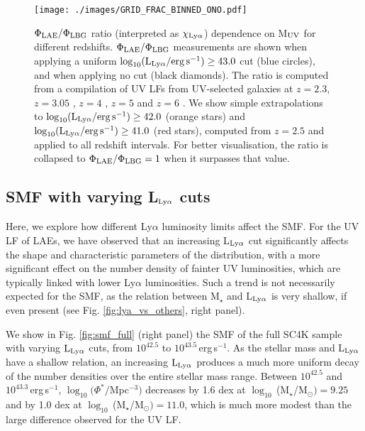 \documentclass[a4paper,fleqn,usenatbib]{mnras}
\begin{document}
%
%
\begin{figure*}
  \centering
  \texttt{[image: ./images/GRID\_FRAC\_BINNED\_ONO.pdf]}
  \caption{$\Phi_{\rm LAE}/\Phi_{\rm LBG}$ ratio (interpreted as $\chi_{\rm Ly\alpha}$) dependence on M$_{\rm UV}$ for different redshifts. $\Phi_{\rm LAE}/\Phi_{\rm LBG}$ measurements are shown when applying a uniform $\log_{10} (\rm L_{Ly\alpha}/erg\,s^{-1}) \geq 43.0$ cut (blue circles), and when applying no cut (black diamonds). The ratio is computed from a compilation of UV LFs from UV-selected galaxies at $z=2.3$, $z=3.05$ \citep{Reddy2009}, $z=4$ , $z=5$ and $z=6$ \citep{Ono2018}. We show simple extrapolations to $\log_{10} (\rm L_{Ly\alpha}/erg\,s^{-1}) \geq 42.0$ (orange stars) and $\log_{10} (\rm L_{Ly\alpha}/erg\,s^{-1}) \geq 41.0$ (red stars), computed from $z=2.5$ and applied to all redshift intervals. For better visualisation, the ratio is collapsed to $\Phi_{\rm LAE}/\Phi_{\rm LBG}=1$ when it surpasses that value.}
  \label{fig:lya_fraction_muv}
\end{figure*}


\subsection{SMF with varying {\rm L$_{\rm Ly\alpha}$} cuts} \label{sec:smf_vary}

Here, we explore how different Ly$\alpha$ luminosity limits affect the SMF. For the UV LF of LAEs, we have observed that an increasing L$_{\rm Ly\alpha}$ cut significantly affects the shape and characteristic parameters of the distribution, with a more significant effect on the number density of fainter UV luminosities, which are typically linked with lower Ly$\alpha$ luminosities. Such a trend is not necessarily expected for the SMF, as the relation between M$_\star$ and L$_{\rm Ly\alpha}$ is very shallow, if even present (see Fig. \ref{fig:lya_vs_others}, right panel).

We show in Fig. \ref{fig:smf_full} (right panel) the SMF of the full SC4K sample with varying ${\rm L_{Ly\alpha}}$ cuts, from $10^{42.5}$ to $10^{43.5}$\,erg\,s$^{-1}$. As the stellar mass and L$_{\rm Ly\alpha}$ have a shallow relation, an increasing ${\rm L_{Ly\alpha}}$ produces a much more uniform decay of the number densities over the entire stellar mass range. Between $10^{42.5}$ and $10^{43.3}$\,erg\,s$^{-1}$, $\log_{10}(\Phi^*/$Mpc$^{-3})$ decreases by 1.6 dex at $\log_{10}\,$(M$_\star$/M$_{\odot})=9.25$ and by 1.0 dex at $\log_{10}\,$(M$_\star$/M$_{\odot})=11.0$, which is much more modest than the large difference observed for the UV LF.
\end{document}
